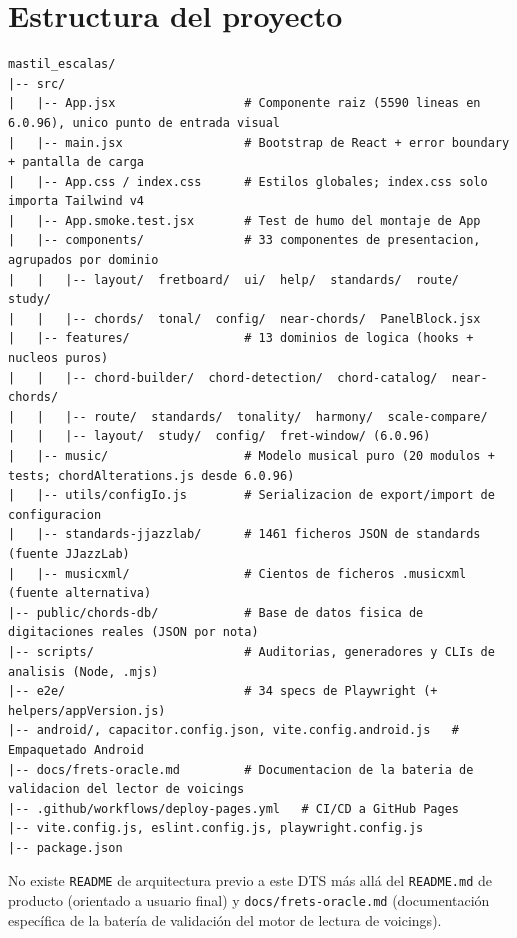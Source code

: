 \documentclass[a4paper,11pt,oneside]{report}
\begin{document}
\chapter{Estructura del proyecto}
\label{sec:4}

\begin{lstlisting}[basicstyle=\ttfamily\footnotesize]
mastil_escalas/
|-- src/
|   |-- App.jsx                  # Componente raiz (5590 lineas en 6.0.96), unico punto de entrada visual
|   |-- main.jsx                 # Bootstrap de React + error boundary + pantalla de carga
|   |-- App.css / index.css      # Estilos globales; index.css solo importa Tailwind v4
|   |-- App.smoke.test.jsx       # Test de humo del montaje de App
|   |-- components/              # 33 componentes de presentacion, agrupados por dominio
|   |   |-- layout/  fretboard/  ui/  help/  standards/  route/  study/
|   |   |-- chords/  tonal/  config/  near-chords/  PanelBlock.jsx
|   |-- features/                # 13 dominios de logica (hooks + nucleos puros)
|   |   |-- chord-builder/  chord-detection/  chord-catalog/  near-chords/
|   |   |-- route/  standards/  tonality/  harmony/  scale-compare/
|   |   |-- layout/  study/  config/  fret-window/ (6.0.96)
|   |-- music/                   # Modelo musical puro (20 modulos + tests; chordAlterations.js desde 6.0.96)
|   |-- utils/configIo.js        # Serializacion de export/import de configuracion
|   |-- standards-jjazzlab/      # 1461 ficheros JSON de standards (fuente JJazzLab)
|   |-- musicxml/                # Cientos de ficheros .musicxml (fuente alternativa)
|-- public/chords-db/            # Base de datos fisica de digitaciones reales (JSON por nota)
|-- scripts/                     # Auditorias, generadores y CLIs de analisis (Node, .mjs)
|-- e2e/                         # 34 specs de Playwright (+ helpers/appVersion.js)
|-- android/, capacitor.config.json, vite.config.android.js   # Empaquetado Android
|-- docs/frets-oracle.md         # Documentacion de la bateria de validacion del lector de voicings
|-- .github/workflows/deploy-pages.yml   # CI/CD a GitHub Pages
|-- vite.config.js, eslint.config.js, playwright.config.js
|-- package.json
\end{lstlisting}

No existe \lstinline!README! de arquitectura previo a este DTS más allá del \lstinline!README.md! de producto (orientado a usuario final) y \lstinline!docs/frets-oracle.md! (documentación específica de la batería de validación del motor de lectura de voicings).
\end{document}
